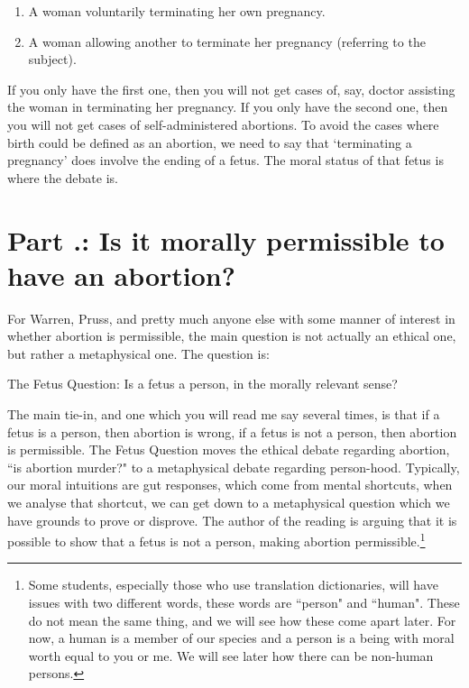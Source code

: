 \begin{enumerate}
\item A woman voluntarily terminating her own pregnancy.  	
\item A woman allowing another to terminate her pregnancy (referring to the subject).
\end{enumerate}
If you only have the first one, then you will not get cases of, say, doctor assisting the woman in terminating her pregnancy. If you only have the second one, then you will not get cases of self-administered abortions.  To avoid the cases where birth could be defined as an abortion, we need to say that `terminating a pregnancy' does involve the ending of a fetus. The moral status of that fetus is where the debate is.  

\section{Part \thechapcount.\theseccount: Is it morally permissible to have an abortion?}

For Warren, Pruss, and pretty much anyone else with some manner of interest in whether abortion is permissible, the main question is not actually an ethical one, but rather a metaphysical one. The question is: 

\begin{center}
The Fetus Question: Is a fetus a person, in the morally relevant sense?
\end{center}

The main tie-in, and one which you will read me say several times, is that if a fetus is a person, then abortion is wrong, if a fetus is not a person, then abortion is permissible. The Fetus Question moves the ethical debate regarding abortion, ``is abortion murder?" to a metaphysical debate regarding person-hood. Typically, our moral intuitions are gut responses, which come from mental shortcuts, when we analyse that shortcut, we can get down to a metaphysical question which we have grounds to prove or disprove. The author of the reading is arguing that it is possible to show that a fetus is not a person, making abortion permissible.\footnote{Some students, especially those who use translation dictionaries, will have issues with two different words, these words are ``person" and ``human". These do not mean the same thing, and we will see how these come apart later. For now, a human is a member of our species and a person is a being with moral worth equal to you or me. We will see later how there can be non-human persons.} 

